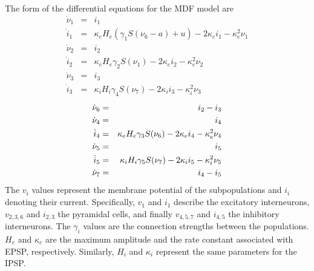 \documentclass[12pt,twoside]{article}
\begin{document}
The form of the differential equations for the MDF model are
\begin{eqnarray}
    \dot{\nu}_{1} &=& i_{1}\\
    \dot{i}_{1} &=& \kappa_{e}H_{e}(\gamma_{1}S(\nu_{6}-a) + u) - 2\kappa_{e}i_{1} - \kappa_{e}^{2}\nu_{1}\\
    \dot{\nu}_{2} &=& i_{2}\\
    \dot{i}_{2} &=& \kappa_{e}H_{e}\gamma_{2}S(\nu_{1}) - 2\kappa_{e}i_{2} - \kappa_{e}^{2}\nu_{2}\\
    \dot{\nu}_{3} &=& i_{3}\\
    \dot{i}_{3} &=& \kappa_{i}H_{i}\gamma_{4}S(\nu_{7}) - 2\kappa_{i}i_{3} - \kappa_{i}^{2}\nu_{3}
\end{eqnarray}
\begin{eqnarray}
    \dot{\nu}_{6} &=& i_{2} - i_{3}\\
    \dot{\nu}_{4} &=& i_{4}\\
    \dot{i}_{4} &=& \kappa_{e}H_{e}\gamma_{3}S(\nu_{6}) - 2\kappa_{e}i_{4} - \kappa_{e}^{2}\nu_{4}\\
    \dot{\nu}_{5} &=& i_{5}\\
    \dot{i}_{5} &=& \kappa_{i}H_{i}\gamma_{5}S(\nu_{7}) - 2\kappa_{i}i_{5} - \kappa_{i}^{2}\nu_{5} \\
    \dot{\nu}_{7} &=& i_{4} - i_{5}
    \vspace{-0.5cm}
\end{eqnarray}
The $v_i$ values represent the membrane potential of the subpopulations and $i_i$ denoting their current. Specifically, $v_1$ and $i_1$ describe the excitatory interneurons, $v_{2,3,6}$ and $i_{2,3}$ the pyramidal cells, and finally $v_{4,5,7}$ and $i_{4,5}$ the inhibitory interneurons. The $\gamma_i$ values are the connection strengths between the populations. $H_e$ and $\kappa_e$ are the maximum amplitude and the rate constant associated with EPSP, respectively. Similarly, $H_i$ and $\kappa_i$ represent the same parameters for the IPSP. 
\end{document}
